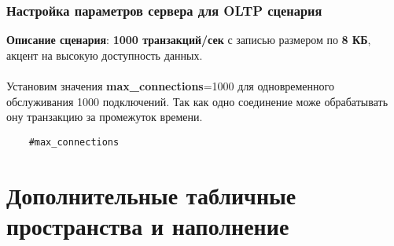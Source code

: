 \documentclass{article}
\begin{document}
\subsubsection{Настройка параметров сервера для OLTP сценария}
\textbf{Описание сценария}: \textbf{1000 транзакций/сек} с
записью размером по \textbf{8 КБ}, акцент на высокую доступность данных.
\\ \\
Установим значения \textbf{max\_connections}=1000 для одновременного обслуживания 1000 подключений. Так как одно соединение може обрабатывать ону транзакцию за промежуток времени.
\begin{verbatim}
    #max_connections
\end{verbatim}
\section{Дополнительные табличные пространства и наполнение}
\end{document}

